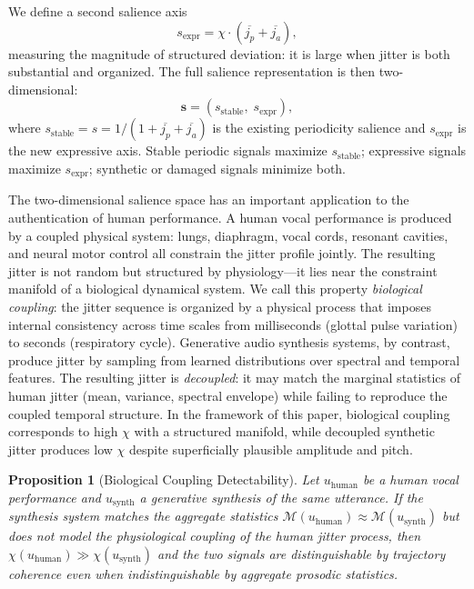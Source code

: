 \documentclass[12pt, a4paper]{article}
\newtheorem{proposition}{Proposition}
\begin{document}
We define a second salience axis
\begin{equation}
s_{\mathrm{expr}} = \chi \cdot (\overline{j_p} + \overline{j_a}),
\label{eq:sexpr}
\end{equation}
measuring the magnitude of structured deviation: it is large when jitter is both substantial and organized. The full salience representation is then two-dimensional:
\begin{equation}
\mathbf{s} = (s_{\mathrm{stable}},\; s_{\mathrm{expr}}),
\label{eq:s2d}
\end{equation}
where $s_{\mathrm{stable}} = s = 1/(1 + \overline{j_p} + \overline{j_a})$ is the existing periodicity salience and $s_{\mathrm{expr}}$ is the new expressive axis. Stable periodic signals maximize $s_{\mathrm{stable}}$; expressive signals maximize $s_{\mathrm{expr}}$; synthetic or damaged signals minimize both.

The two-dimensional salience space has an important application to the authentication of human performance. A human vocal performance is produced by a coupled physical system: lungs, diaphragm, vocal cords, resonant cavities, and neural motor control all constrain the jitter profile jointly. The resulting jitter is not random but structured by physiology---it lies near the constraint manifold of a biological dynamical system. We call this property \emph{biological coupling}: the jitter sequence is organized by a physical process that imposes internal consistency across time scales from milliseconds (glottal pulse variation) to seconds (respiratory cycle). Generative audio synthesis systems, by contrast, produce jitter by sampling from learned distributions over spectral and temporal features. The resulting jitter is \emph{decoupled}: it may match the marginal statistics of human jitter (mean, variance, spectral envelope) while failing to reproduce the coupled temporal structure. In the framework of this paper, biological coupling corresponds to high $\chi$ with a structured manifold, while decoupled synthetic jitter produces low $\chi$ despite superficially plausible amplitude and pitch.

\begin{proposition}[Biological Coupling Detectability]
Let $u_{\mathrm{human}}$ be a human vocal performance and $u_{\mathrm{synth}}$ a generative synthesis of the same utterance. If the synthesis system matches the aggregate statistics $\mathcal{M}(u_{\mathrm{human}}) \approx \mathcal{M}(u_{\mathrm{synth}})$ but does not model the physiological coupling of the human jitter process, then $\chi(u_{\mathrm{human}}) \gg \chi(u_{\mathrm{synth}})$ and the two signals are distinguishable by trajectory coherence even when indistinguishable by aggregate prosodic statistics.
\end{proposition}
\end{document}
